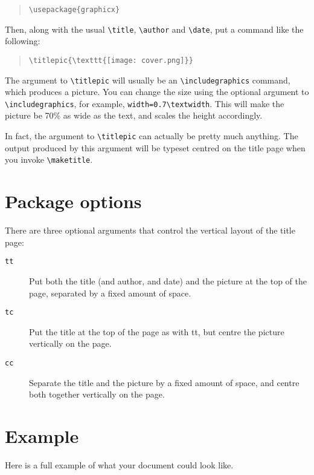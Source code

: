 \documentclass[titlepage]{article}
\begin{document}
\begin{quote}
	\verb$\usepackage{graphicx}$
\end{quote}

Then, along with the usual \verb$\title$, \verb$\author$ and \verb$\date$, put a command like the following:

\begin{quote}
	\verb$\titlepic{\texttt{[image: cover.png]}}$
\end{quote}

The argument to \verb$\titlepic$ will usually be an \verb$\includegraphics$ command, which produces a picture. You can change the size using the optional argument to \verb$\includegraphics$, for example, \verb$width=0.7\textwidth$. This will make the picture be 70\% as wide as the text, and scales the height accordingly.

In fact, the argument to \verb$\titlepic$ can actually be pretty much anything. The output produced by this argument will be typeset centred on the title page when you invoke \verb$\maketitle$.

\section{Package options}

There are three optional arguments that control the vertical layout of the title page:

\begin{description}
\item[\tt{tt}]
	Put both the title (and author, and date) and the picture at the top of the page, separated by a fixed amount of space.
\item[\tt{tc}]
	Put the title at the top of the page as with tt, but centre the picture vertically on the page.
\item[\tt{cc}]
	Separate the title and the picture by a fixed amount of space, and centre both together vertically on the page.
\end{description}

\section{Example}

Here is a full example of what your document could look like.
\end{document}
